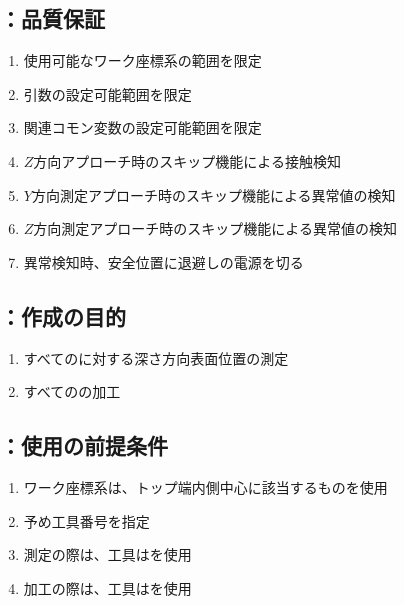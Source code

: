 \subsection{\MCenterline：品質保証}
\begin{enumerate}[label*=\sarrow]
\item 使用可能なワーク座標系の範囲を限定
\item {}引数の設定可能範囲を限定
\item 関連コモン変数の設定可能範囲を限定
\item $Z$方向アプローチ時のスキップ機能による接触検知
\item $Y$方向測定アプローチ時のスキップ機能による異常値の検知
\item $Z$方向測定アプローチ時のスキップ機能による異常値の検知
\item 異常検知時、安全位置に退避し\TouchSensorProbe の電源を切る
\end{enumerate}



\clearpage


\subsection{\DLone：作成の目的}
\begin{enumerate}[label*=\sarrow]
\item すべての\Dimple に対する深さ方向表面位置の測定
\item すべての\Dimple の加工
\end{enumerate}


\subsection{\DLone：使用の前提条件}
\begin{enumerate}[label*=\sarrow]
\item {}ワーク座標系は、トップ端内側中心に該当するものを使用
\item 予め工具番号を指定
\item 測定の際は、工具は\TouchSensorProbe を使用
\item 加工の際は、工具は\TSlotCutter を使用
\end{enumerate}


